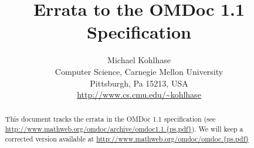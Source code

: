 \documentclass[11pt,]{article}
\title{Errata to the OMDoc 1.1 Specification}
\author{Michael Kohlhase\\
  Computer Science, Carnegie Mellon University\\
  Pittsburgh, Pa 15213, USA\\
  {\url{http://www.cs.cmu.edu/~kohlhase}}}
\begin{document}
\maketitle
\begin{abstract}
  This document tracks the errata in the OMDoc 1.1 specification (see
  {\url{http://www.mathweb.org/omdoc/archive/omdoc1.1.{ps,pdf}}}). We will keep a
    corrected version available at
    {\url{http://www.mathweb.org/omdoc/omdoc.{ps.pdf}}}
\end{abstract}

\newpage 
 

\newpage
{\small}
\end{document}
